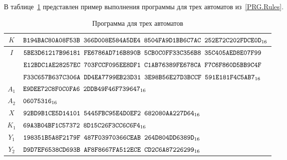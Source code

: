 \label{TEST.Prg3}

В таблице~\ref{Table.TEST.Prg3} представлен пример выполнения 
программы для трех автоматов из~\ref{PRG.Rules}.

\begin{table}[H]
\caption{Программа для трех автоматов}\label{Table.TEST.Prg3}
\begin{tabular}{|c|l|}
\hline
$K$ &
$\texttt{B194BAC80A08F53B~366D008E584A5DE4~8504FA9D1BB6C7AC~252E72C202FDCE0D}_{16}$\\
\hline
$I$ &
$\texttt{5BE3D61217B96181~FE6786AD716B890B~5CB0C0FF33C356B8~35C405AED8E07F99}$\\
&
$\texttt{E12BDC1AE28257EC~703FCCF095EE8DF1~C1AB76389FE678CA~F7C6F860D5BB9C4F}$\\
&
$\texttt{F33C657B637C306A~DD4EA7799EB23D31~3E98B56E27D3BCCF~591E181F4C5AB7}_{16}$\\
\hline
$A_1$ 
&
$\texttt{E9DEE72C8F0C0FA6~2DDB49F46F739647}_{16}$\\
\hline
$A_2$ 
&
$\texttt{06075316}_{16}$\\
\hline
$X$ 
&
$\texttt{92BD9B1CE5D14101~5445FBC95E4D0EF2~682080AA227D64}_{16}$\\
\hline
\hline
$K_1$ 
&
$\texttt{69A3B04BF1C57372~8D15C26F3CC6C6F4}_{16}$\\
\hline
$Y_1$ 
&
$\texttt{198351B5A8F2179F~487F03970366CEAB~264D804DD6389D}_{16}$\\
\hline
$Y_2$ 
&
$\texttt{D9D7EF6538CD693B~AF8F8667FA512ECE~CD2C6A87226299}_{16}$\\
\hline
\end{tabular}
\end{table}
